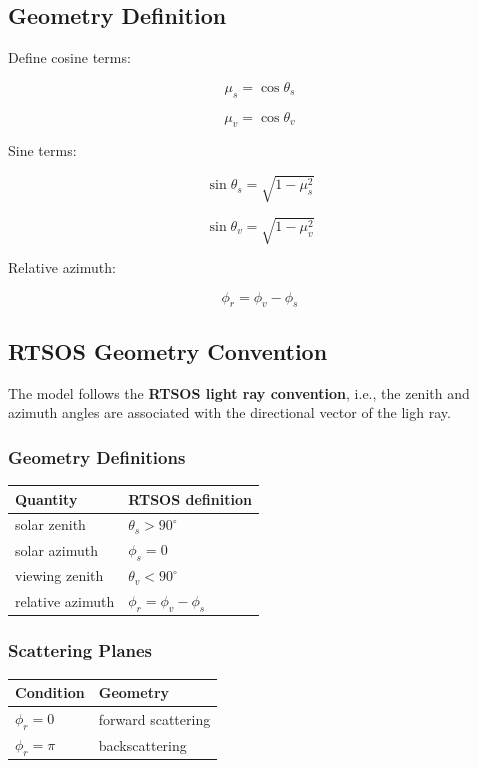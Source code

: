\documentclass[
  11pt,
  letterpaper,
  DIV=11,
  numbers=noendperiod]{scrreprt}
\begin{document}
\subsection{Geometry Definition}\label{geometry-definition}

Define cosine terms:

\[
\mu_s = \cos\theta_s
\]

\[
\mu_v = \cos\theta_v
\]

Sine terms:

\[
\sin\theta_s = \sqrt{1-\mu_s^2}
\]

\[
\sin\theta_v = \sqrt{1-\mu_v^2}
\]

Relative azimuth:

\[
\phi_r = \phi_v - \phi_s
\]

\subsection{RTSOS Geometry Convention}\label{rtsos-geometry-convention}

The model follows the \textbf{RTSOS light ray convention}, i.e., the
zenith and azimuth angles are associated with the directional vector of
the ligh ray.

\subsubsection{Geometry Definitions}\label{geometry-definitions}

\begin{longtable}[]{@{}ll@{}}
\toprule\noalign{}
Quantity & RTSOS definition \\
\midrule\noalign{}
\endhead
\bottomrule\noalign{}
\endlastfoot
solar zenith & \(\theta_s > 90^\circ\) \\
solar azimuth & \(\phi_s = 0\) \\
viewing zenith & \(\theta_v < 90^\circ\) \\
relative azimuth & \(\phi_r = \phi_v - \phi_s\) \\
\end{longtable}

\subsubsection{Scattering Planes}\label{scattering-planes}

\begin{longtable}[]{@{}ll@{}}
\toprule\noalign{}
Condition & Geometry \\
\midrule\noalign{}
\endhead
\bottomrule\noalign{}
\endlastfoot
\(\phi_r = 0\) & forward scattering \\
\(\phi_r = \pi\) & backscattering \\
\end{longtable}
\end{document}
